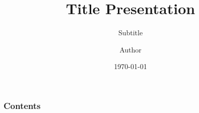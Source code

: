 \documentclass{beamer}
\title{Title Presentation}
\subtitle{Subtitle}
\author{Author}
\date{\today}
\begin{document}
    \begin{frame}
        \titlepage
    \end{frame}
    \begin{frame}
        \frametitle{Contents}
        \tableofcontents
    \end{frame}
    \begin{frame}
        \frametitle{}

    \end{frame}
\end{document}
